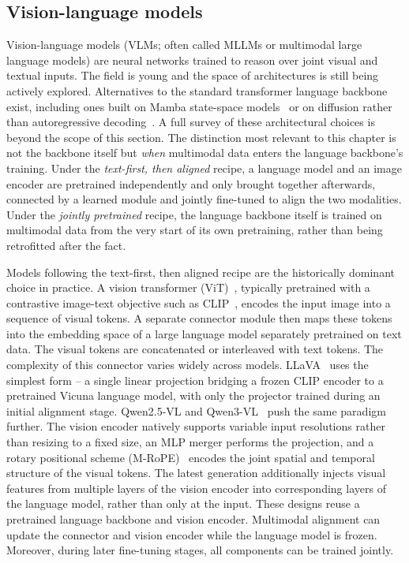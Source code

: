 \subsection{Vision-language models}
\label{sec:prelim-vlm}

Vision-language models (VLMs; often called MLLMs or multimodal large language models) are neural networks trained to reason over joint visual and textual inputs. The field is young and the space of architectures is still being actively explored. Alternatives to the standard transformer language backbone exist, including ones built on Mamba state-space models~\cite{qiao2024vlmamba} or on diffusion rather than autoregressive decoding~\cite{you2025lladav}. A full survey of these architectural choices is beyond the scope of this section. The distinction most relevant to this chapter is not the backbone itself but \emph{when} multimodal data enters the language backbone's training. Under the \emph{text-first, then aligned} recipe, a language model and an image encoder are pretrained independently and only brought together afterwards, connected by a learned module and jointly fine-tuned to align the two modalities. Under the \emph{jointly pretrained} recipe, the language backbone itself is trained on multimodal data from the very start of its own pretraining, rather than being retrofitted after the fact.

Models following the text-first, then aligned recipe are the historically dominant choice in practice. A vision transformer (ViT)~\cite{dosovitskiy2021image}, typically pretrained with a contrastive image-text objective such as CLIP~\cite{radford2021learning}, encodes the input image into a sequence of visual tokens. A separate connector module then maps these tokens into the embedding space of a large language model separately pretrained on text data. The visual tokens are concatenated or interleaved with text tokens. The complexity of this connector varies widely across models. LLaVA~\cite{liu2023llava} uses the simplest form -- a single linear projection bridging a frozen CLIP encoder to a pretrained Vicuna language model, with only the projector trained during an initial alignment stage. Qwen2.5-VL and Qwen3-VL~\cite{bai2025qwen2,bai2025qwen3vl} push the same paradigm further. The vision encoder natively supports variable input resolutions rather than resizing to a fixed size, an MLP merger performs the projection, and a rotary positional scheme (M-RoPE)~\cite{Qwen2VL} encodes the joint spatial and temporal structure of the visual tokens. The latest generation additionally injects visual features from multiple layers of the vision encoder into corresponding layers of the language model, rather than only at the input. These designs reuse a pretrained language backbone and vision encoder. Multimodal alignment can update the connector and vision encoder while the language model is frozen. Moreover, during later fine-tuning stages, all components can be trained jointly.

